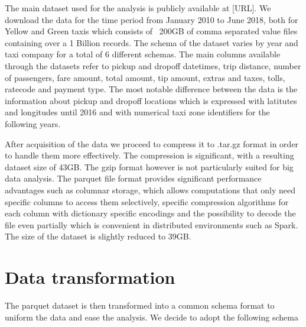 \documentclass{acm_proc_article-sp-sigmod09}
\begin{document}
The main dataset used for the analysis is publicly available at [URL]. We download the data for the time period from January 2010 to June 2018, both for Yellow and Green taxis which consists of ~200GB of comma separated value files containing over a 1 Billion records. The schema of the dataset varies by year and taxi company for a total of 6 different schemas. The main columns available through the datasets refer to pickup and dropoff datetimes, trip distance, number of passengers, fare amount, total amount, tip amount, extras and taxes, tolls, ratecode and payment type. The most notable difference between the data is the information about pickup and dropoff locations which is expressed with latitutes and longitudes until 2016 and with numerical taxi zone identifiers for the following years.

After acquisition of the data we proceed to compress it to .tar.gz format in order to handle them more effectively. The compression is significant, with a resulting dataset size of 43GB. The gzip format however is not particularly suited for big data analysis. The parquet file format provides significant performance advantages such as columnar storage, which allows computations that only need specific columns to access them selectively, specific compression algorithms for each column with dictionary specific encodings and the possibility to decode the file even partially which is convenient in distributed environments such as Spark. The size of the dataset is slightly reduced to 39GB.

\section{Data transformation}

The parquet dataset is then transformed into a common schema format to uniform the data and ease the analysis. We decide to adopt the following schema
\end{document}
